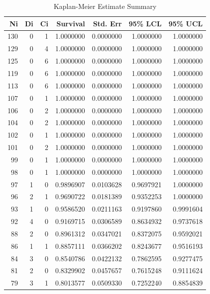 \documentclass[
]{article}
\begin{document}
\begin{table}[!h]

\caption{\label{tab:km.table}Kaplan-Meier Estimate Summary}
\centering
\begin{tabular}[t]{r|r|r|r|r|r|r}
\hline
Ni & Di & Ci & Survival & Std. Err & 95\% LCL & 95\% UCL\\
\hline
130 & 0 & 1 & 1.0000000 & 0.0000000 & 1.0000000 & 1.0000000\\
\hline
129 & 0 & 4 & 1.0000000 & 0.0000000 & 1.0000000 & 1.0000000\\
\hline
125 & 0 & 6 & 1.0000000 & 0.0000000 & 1.0000000 & 1.0000000\\
\hline
119 & 0 & 6 & 1.0000000 & 0.0000000 & 1.0000000 & 1.0000000\\
\hline
113 & 0 & 6 & 1.0000000 & 0.0000000 & 1.0000000 & 1.0000000\\
\hline
107 & 0 & 1 & 1.0000000 & 0.0000000 & 1.0000000 & 1.0000000\\
\hline
106 & 0 & 2 & 1.0000000 & 0.0000000 & 1.0000000 & 1.0000000\\
\hline
104 & 0 & 2 & 1.0000000 & 0.0000000 & 1.0000000 & 1.0000000\\
\hline
102 & 0 & 1 & 1.0000000 & 0.0000000 & 1.0000000 & 1.0000000\\
\hline
101 & 0 & 2 & 1.0000000 & 0.0000000 & 1.0000000 & 1.0000000\\
\hline
99 & 0 & 1 & 1.0000000 & 0.0000000 & 1.0000000 & 1.0000000\\
\hline
98 & 0 & 1 & 1.0000000 & 0.0000000 & 1.0000000 & 1.0000000\\
\hline
97 & 1 & 0 & 0.9896907 & 0.0103628 & 0.9697921 & 1.0000000\\
\hline
96 & 2 & 1 & 0.9690722 & 0.0181389 & 0.9352253 & 1.0000000\\
\hline
93 & 1 & 0 & 0.9586520 & 0.0211163 & 0.9197860 & 0.9991604\\
\hline
92 & 4 & 0 & 0.9169715 & 0.0306589 & 0.8634932 & 0.9737618\\
\hline
88 & 2 & 0 & 0.8961312 & 0.0347021 & 0.8372075 & 0.9592021\\
\hline
86 & 1 & 1 & 0.8857111 & 0.0366202 & 0.8243677 & 0.9516193\\
\hline
84 & 3 & 0 & 0.8540786 & 0.0422132 & 0.7862595 & 0.9277475\\
\hline
81 & 2 & 0 & 0.8329902 & 0.0457657 & 0.7615248 & 0.9111624\\
\hline
79 & 3 & 1 & 0.8013577 & 0.0509330 & 0.7252240 & 0.8854839\\

\end{tabular}
\end{table}
\end{document}
